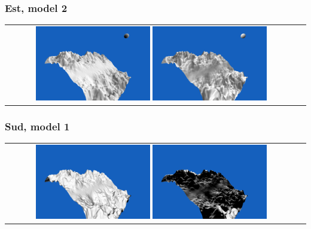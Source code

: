 \documentclass[a4paper]{article}
\begin{document}
\subsubsection{Est, model 2}
\begin{tabular}{cc}
\includegraphics[width=0.4\textwidth]{Images/Essais/Essai_11_phong_East_1.png}
\includegraphics[width=0.4\textwidth]{Images/Essais/Essai_11_slint_East_1.png}
\end{tabular}
\subsubsection{Sud, model 1}
\begin{tabular}{cc}
\includegraphics[width=0.4\textwidth]{Images/Essais/Essai_11_phong_South_0.png}
\includegraphics[width=0.4\textwidth]{Images/Essais/Essai_11_slint_South_0.png}
\end{tabular}
\end{document}
